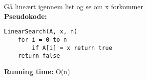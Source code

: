 Gå lineært igennem list og se om x forkommer\\
\textbf{Pseudokode:}
\begin{lstlisting}[frame=single, mathescape=true]
LinearSearch(A, x, n)
	for i = 0 to n
		if A[i] = x return true
	return false
\end{lstlisting}
\textbf{Running time:} O(n)
